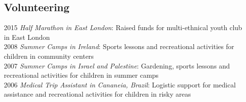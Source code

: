 \documentclass[margin]{res}
\begin{document}
\begin{resume}
\section{Volunteering}
    2015 \textit{Half Marathon in East London}: {Raised funds for multi-ethnical youth club in East London} \\
    2008 \textit{Summer Camps in Ireland}: {Sports lessons and recreational activities for children in community centers} \\
    2007 \textit{Summer Camps in Israel and Palestine}: {Gardening, sports lessons and recreational activities for children in summer camps} \\
    2006 \textit{Medical Trip Assistant in Cananeia, Brazil}: {Logistic support for medical assistance and recreational activities for children in risky areas} \\

\end{resume} 
\end{document}
